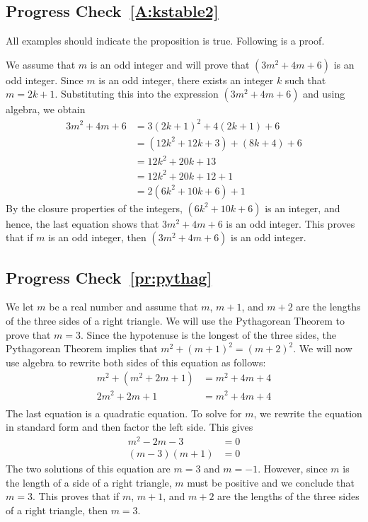 \subsection*{Progress Check~\ref{A:kstable2}}
All examples should indicate the proposition is true.  Following is a proof.
\begin{myproof}
We assume that $m$ is an odd integer and will prove that $\left( 3m^2 + 4m + 6 \right)$ is an odd integer.  Since $m$ is an odd integer, there exists an integer $k$ such that $m = 2k + 1$.  Substituting this into the expression $\left( 3m^2 + 4m + 6 \right)$ and using algebra, we obtain
\begin{align*}
3m^2 + 4m + 6 &= 3\left(2k + 1 \right)^2 + 4 \left(2k + 1 \right) + 6 \\
              &= \left( 12k^2 + 12k + 3 \right) + \left( 8k + 4 \right) + 6  \\
              &= 12k^2 + 20k + 13 \\
              &= 12k^2 + 20k + 12 + 1 \\
              &= 2 \left(6k^2 + 10k + 6 \right) + 1
\end{align*}
By the closure properties of the integers, $\left(6k^2 + 10k + 6 \right)$ is an integer, and hence, the last equation shows that $3m^2 + 4m + 6$ is an odd integer.  This proves that if $m$ is an odd integer, then $\left( 3m^2 + 4m + 6 \right)$ is an odd integer.
\end{myproof}


\subsection*{Progress Check~\ref{pr:pythag}}
\begin{myproof}
We let $m$ be a real number and assume that $m$, $m + 1$, and $m + 2$ are the lengths of the three sides of a right triangle.  We will use the Pythagorean Theorem to prove that $m = 3$.  Since the hypotenuse is the longest of the three sides, the Pythagorean Theorem implies that $m^2 + (m + 1)^2 = (m + 2)^2$.  We will now use algebra to rewrite both sides of this equation as follows:
\begin{align*}
m^2 + \left( m^2 + 2m + 1 \right) &= m^2 + 4m + 4 \\
2m^2 + 2m + 1 &= m^2 + 4m + 4 \\
\end{align*}
The last equation is a quadratic equation.  To solve for $m$, we rewrite the equation in standard form and then factor the left side.  This gives
\begin{align*}
m^2 - 2m - 3 &= 0 \\
(m - 3)(m + 1) &= 0
\end{align*}
The two solutions of this equation are $m = 3$ and $m = -1$.  However, since $m$ is the length of a side of a right triangle, $m$ must be positive and we conclude that $m = 3$.  This proves that if $m$, $m + 1$, and $m + 2$ are the lengths of the three sides of a right triangle, then $m = 3$.
\end{myproof}
\hbreak


\endinput
